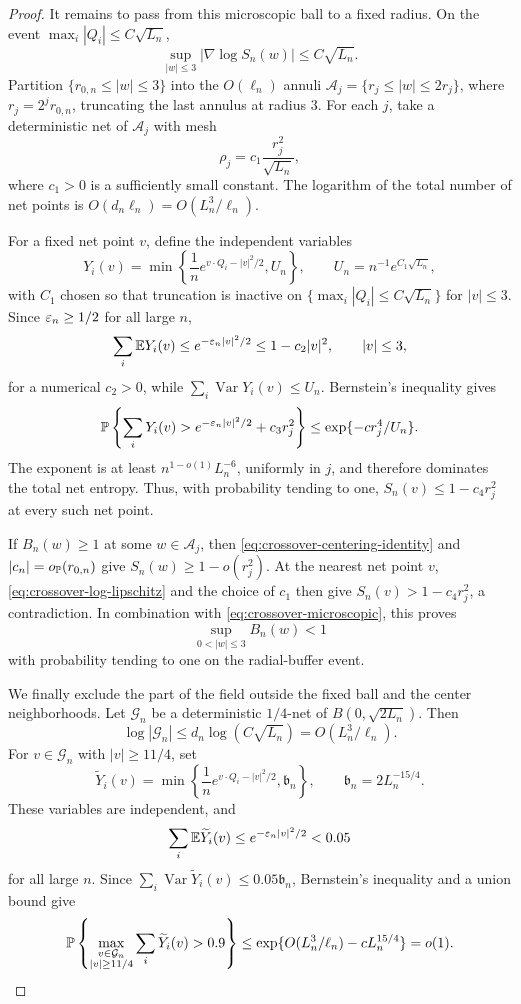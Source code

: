 \begin{proof}
It remains to pass from this microscopic ball to a fixed radius.  On the
event \(\max_i|Q_i|\le C\sqrt{L_n}\),
\begin{equation}
\label{eq:crossover-log-lipschitz}
 \sup_{|w|\le3}|\nabla\log S_n(w)|\le C\sqrt{L_n}.
\end{equation}
Partition \(\{r_{0,n}\le|w|\le3\}\) into the \(O(\ell_n)\) annuli
\(\mathcal A_j=\{r_j\le|w|\le2r_j\}\), where \(r_j=2^jr_{0,n}\),
truncating the last annulus at radius \(3\).  For each \(j\), take a
deterministic net of \(\mathcal A_j\) with mesh
\[
 \rho_j=c_1\frac{r_j^2}{\sqrt{L_n}},
\]
where \(c_1>0\) is a sufficiently small constant.  The logarithm of the
total number of net points is \(O(d_n\ell_n)=O(L_n^3/\ell_n)\).

For a fixed net point \(v\), define the independent variables
\[
 Y_i(v)=\min\left\{
  \frac1n e^{v\cdot Q_i-|v|^2/2},
  U_n
 \right\},
 \qquad
 U_n=n^{-1}e^{C_1\sqrt{L_n}},
\]
with \(C_1\) chosen so that truncation is inactive on
\(\{\max_i|Q_i|\le C\sqrt{L_n}\}\) for \(|v|\le3\).  Since
\(\varepsilon_n\ge1/2\) for all large \(n\),
\[
 \sum_i\mathbb E Y_i(v)
 \le e^{-\varepsilon_n|v|^2/2}
 \le1-c_2|v|^2,
 \qquad |v|\le3,
\]
for a numerical \(c_2>0\), while
\(\sum_i\operatorname{Var}Y_i(v)\le U_n\).  Bernstein's inequality gives
\[
 \mathbb P\left\{\sum_iY_i(v)>
  e^{-\varepsilon_n|v|^2/2}+c_3r_j^2\right\}
 \le\exp\{-c r_j^4/U_n\}.
\]
The exponent is at least \(n^{1-o(1)}L_n^{-6}\), uniformly in \(j\), and
therefore dominates the total net entropy.  Thus, with probability tending
to one, \(S_n(v)\le1-c_4r_j^2\) at every such net point.

If \(B_n(w)\ge1\) at some \(w\in\mathcal A_j\), then
\eqref{eq:crossover-centering-identity} and
\(|c_n|=o_{\mathbb P}(r_{0,n})\) give \(S_n(w)\ge1-o(r_j^2)\).
At the nearest net point \(v\), \eqref{eq:crossover-log-lipschitz} and the
choice of \(c_1\) then give \(S_n(v)>1-c_4r_j^2\), a contradiction.  In
combination with \eqref{eq:crossover-microscopic}, this proves
\begin{equation}
\label{eq:crossover-inner}
 \sup_{0<|w|\le3}B_n(w)<1
\end{equation}
with probability tending to one on the radial-buffer event.

We finally exclude the part of the field outside the fixed ball and the
center neighborhoods.  Let \(\mathcal G_n\) be a deterministic
\(1/4\)-net of \(B(0,\sqrt{2L_n})\).  Then
\[
 \log|\mathcal G_n|
 \le d_n\log(C\sqrt{L_n})
 =O(L_n^3/\ell_n).
\]
For \(v\in\mathcal G_n\) with \(|v|\ge11/4\), set
\[
 \widetilde Y_i(v)
 =
 \min\left\{
  \frac1n e^{v\cdot Q_i-|v|^2/2},
  \mathfrak b_n
 \right\},
 \qquad \mathfrak b_n=2L_n^{-15/4}.
\]
These variables are independent, and
\[
 \sum_i\mathbb E\widetilde Y_i(v)
 \le e^{-\varepsilon_n|v|^2/2}<0.05
\]
for all large \(n\).  Since
\(\sum_i\operatorname{Var}\widetilde Y_i(v)\le0.05\mathfrak b_n\), Bernstein's
inequality and a union bound give
\begin{equation}
\label{eq:crossover-outer-net}
 \mathbb P\left\{
  \max_{\substack{v\in\mathcal G_n\\|v|\ge11/4}}
  \sum_i\widetilde Y_i(v)>0.9
 \right\}
 \le
 \exp\{O(L_n^3/\ell_n)-cL_n^{15/4}\}
 =o(1).
\end{equation}


\end{proof}
